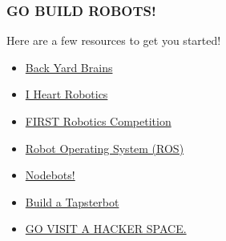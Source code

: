 \documentclass[compress]{beamer}
\begin{document}
\begin{frame}
  \frametitle{GO BUILD ROBOTS!}
  Here are a few resources to get you started!
  \begin{itemize}
    \item \href{http://www.backyardbrains.com}{Back Yard Brains}
    \item \href{http://store.iheartengineering.com/robots/turtlebot.html}{I Heart Robotics}
    \item \href{http://www.usfirst.org/roboticsprograms/frc}{FIRST Robotics Competition}
    \item \href{http://www.ros.org/wiki/}{Robot Operating System (ROS)}
    \item \href{http://nodebots.io/}{Nodebots!}
    \item \href{https://github.com/hugs/tapsterbot}{Build a Tapsterbot}
    \item \href{http://hackerspaces.org/wiki/List_of_Hacker_Spaces}{GO VISIT A HACKER SPACE.}
  \end{itemize}
\end{frame}
\end{document}
